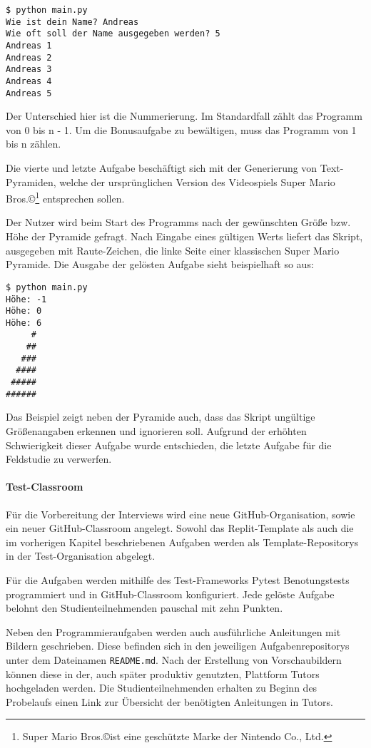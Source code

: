 \begin{lstlisting}[style=Bash]
$ python main.py
Wie ist dein Name? Andreas
Wie oft soll der Name ausgegeben werden? 5
Andreas 1
Andreas 2
Andreas 3
Andreas 4
Andreas 5
\end{lstlisting}

Der Unterschied hier ist die Nummerierung. Im Standardfall zählt das Programm
von 0 bis n - 1. Um die Bonusaufgabe zu bewältigen, muss das Programm von 1 bis
n zählen.

Die vierte und letzte Aufgabe beschäftigt sich mit der Generierung von
Text-Pyramiden, welche der ursprünglichen Version des Videospiels Super Mario
Bros.\copyright\footnote{Super Mario Bros.\copyright ist eine geschützte Marke
der Nintendo Co., Ltd.} entsprechen sollen. \parencite{git-repo:mario-less}

Der Nutzer wird beim Start des Programms nach der gewünschten Größe bzw. Höhe
der Pyramide gefragt. Nach Eingabe eines gültigen Werts liefert das Skript,
ausgegeben mit Raute-Zeichen, die linke Seite einer klassischen Super Mario
Pyramide. Die Ausgabe der gelösten Aufgabe sieht beispielhaft so aus:

\begin{lstlisting}[style=Bash]
$ python main.py
Höhe: -1
Höhe: 0
Höhe: 6
     #
    ##
   ###
  ####
 #####
######
\end{lstlisting}

\newpage

Das Beispiel zeigt neben der Pyramide auch, dass das Skript ungültige
Größenangaben erkennen und ignorieren soll. Aufgrund der erhöhten Schwierigkeit
dieser Aufgabe wurde entschieden, die letzte Aufgabe für die Feldstudie zu
verwerfen.

\paragraph{Test-Classroom}
Für die Vorbereitung der Interviews wird eine neue GitHub-Organisation, sowie
ein neuer GitHub-Classroom angelegt. Sowohl das Replit-Template als auch die im
vorherigen Kapitel beschriebenen Aufgaben werden als Template-Repositorys in
der Test-Organisation abgelegt. \parencite{git-orga:ndhbr-classroom}

Für die Aufgaben werden mithilfe des Test-Frameworks Pytest Benotungstests
programmiert und in GitHub-Classroom konfiguriert. Jede gelöste Aufgabe belohnt
den Studienteilnehmenden pauschal mit zehn Punkten.

Neben den Programmieraufgaben werden auch ausführliche Anleitungen mit Bildern
geschrieben. Diese befinden sich in den jeweiligen Aufgabenrepositorys unter dem
Dateinamen \texttt{README.md}. Nach der Erstellung von Vorschaubildern können
diese in der, auch später produktiv genutzten, Plattform Tutors hochgeladen
werden. Die Studienteilnehmenden erhalten zu Beginn des Probelaufs einen Link
zur Übersicht der benötigten Anleitungen in Tutors.

